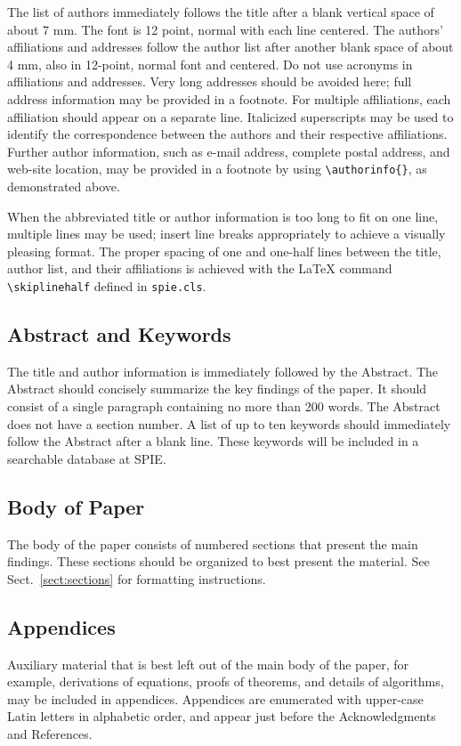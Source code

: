 \documentclass[]{spie}  %
\begin{document}
The list of authors immediately follows the title after a blank vertical space of about 7 mm.  The font is 12 point, normal with each line centered.  The authors' affiliations and addresses follow the author list after another blank space of about 4 mm, also in 12-point, normal font and centered.  Do not use acronyms in affiliations and addresses.  Very long addresses should be avoided here; full address information may be provided in a footnote.  For multiple affiliations, each affiliation should appear on a separate line.  Italicized superscripts may be used to identify the correspondence between the authors and their respective affiliations.  Further author information, such as e-mail address, complete postal address, and web-site location, may be provided in a footnote by using \verb|\authorinfo{}|, as demonstrated above.

When the abbreviated title or author information is too long to fit on one line, multiple lines may be used; insert line breaks appropriately to achieve a visually pleasing format.  The proper spacing of one and one-half lines between the title, author list, and their affiliations is achieved with the LaTeX command \verb|\skiplinehalf| defined in {\tt spie.cls}.

\subsection{Abstract and Keywords} 
The title and author information is immediately followed by the Abstract. The Abstract should concisely summarize the key findings of the paper.  It should consist of a single paragraph containing no more than 200 words.  The Abstract does not have a section number.  A list of up to ten keywords should immediately follow the Abstract after a blank line.  These keywords will be included in a searchable database at SPIE.

\subsection{Body of Paper} 
The body of the paper consists of numbered sections that present the main findings.  These sections should be organized to best present the material.  See Sect.~\ref{sect:sections} for formatting instructions.

\subsection{Appendices} 
Auxiliary material that is best left out of the main body of the paper, for example, derivations of equations, proofs of theorems, and details of algorithms, may be included in appendices.  Appendices are enumerated with upper-case Latin letters in alphabetic order, and appear just before the Acknowledgments and References.
\end{document}
